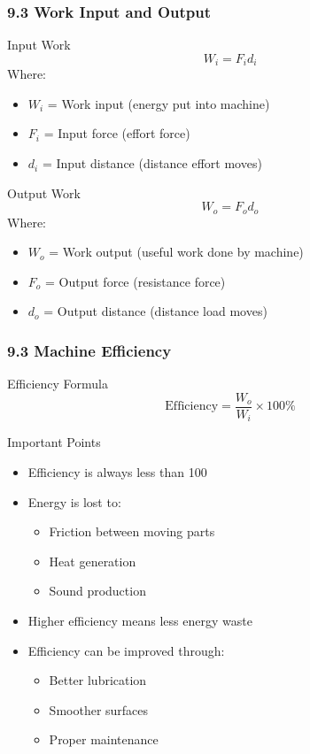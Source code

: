 \documentclass{beamer}
\begin{document}
\begin{frame}
\frametitle{9.3 Work Input and Output}
\begin{block}{Input Work}
$$W_i = F_id_i$$
Where:
\begin{itemize}
\item $W_i$ = Work input (energy put into machine)
\item $F_i$ = Input force (effort force)
\item $d_i$ = Input distance (distance effort moves)
\end{itemize}
\end{block}

\begin{block}{Output Work}
$$W_o = F_od_o$$
Where:
\begin{itemize}
\item $W_o$ = Work output (useful work done by machine)
\item $F_o$ = Output force (resistance force)
\item $d_o$ = Output distance (distance load moves)
\end{itemize}
\end{block}
\end{frame}

\begin{frame}
\frametitle{9.3 Machine Efficiency}
\begin{block}{Efficiency Formula}
$$\text{Efficiency} = \frac{W_o}{W_i} \times 100\%$$
\end{block}

\begin{block}{Important Points}
\begin{itemize}
\item Efficiency is always less than 100%
\item Energy is lost to:
 \begin{itemize}
 \item Friction between moving parts
 \item Heat generation
 \item Sound production
 \end{itemize}
\item Higher efficiency means less energy waste
\item Efficiency can be improved through:
 \begin{itemize}
 \item Better lubrication
 \item Smoother surfaces
 \item Proper maintenance
 \end{itemize}
\end{itemize}
\end{block}
\end{frame}
\end{document}
